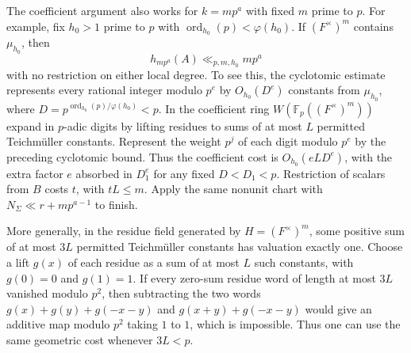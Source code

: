 \documentclass[11pt,letterpaper]{article}
\theoremstyle{definition}
\numberwithin{equation}{section}
\begin{document}
The coefficient argument also works for $k=mp^a$ with fixed $m$
prime to $p$. For example, fix $h_0>1$ prime to $p$ with
$\operatorname{ord}_{h_0}(p)<\varphi(h_0)$. If $(F^\times)^m$
contains $\mu_{h_0}$, then
\[
                     h_{mp^a}(A)\ll_{p,m,h_0} mp^a
\]
with no restriction on either local degree. To see this, the
cyclotomic estimate represents every rational integer modulo $p^e$
by $O_{h_0}(D^e)$ constants from $\mu_{h_0}$, where
$D=p^{\operatorname{ord}_{h_0}(p)/\varphi(h_0)}<p$.
In the coefficient ring $W(\mathbb F_p((F^\times)^m))$ expand
in $p$-adic digits by lifting residues to sums of at most $L$
permitted Teichm\"uller constants. Represent the weight $p^j$ of
each digit modulo $p^e$ by the preceding cyclotomic bound. Thus
the coefficient cost is $O_{h_0}(eLD^e)$, with the extra factor $e$
absorbed in $D_1^e$ for any fixed $D<D_1<p$. Restriction of
scalars from $B$ costs $t$, with $tL\le m$. Apply the same
nonunit chart with $N_\Sigma\ll r+mp^{a-1}$ to finish.

More generally, in the residue field generated by
$H=(F^\times)^m$, some positive sum of at most $3L$ permitted
Teichm\"uller constants has valuation exactly one. Choose a
lift $g(x)$ of each residue as a sum of at most $L$ such constants,
with $g(0)=0$ and $g(1)=1$. If every zero-sum residue word of
length at most $3L$ vanished modulo $p^2$, then subtracting the
two words $g(x)+g(y)+g(-x-y)$ and $g(x+y)+g(-x-y)$ would give
an additive map modulo $p^2$ taking $1$ to $1$, which is impossible.
Thus one can use the same geometric cost whenever $3L<p$.
\end{document}
